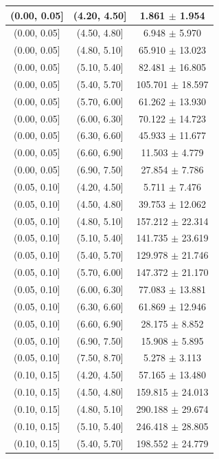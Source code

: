 \begin{longtable}{|c|c|c|}
\hline
\endlastfoot
(0.00, 0.05] & (4.20, 4.50] & 1.861 $\pm$ 1.954 \\ 
\hline
(0.00, 0.05] & (4.50, 4.80] & 6.948 $\pm$ 5.970 \\ 
\hline
(0.00, 0.05] & (4.80, 5.10] & 65.910 $\pm$ 13.023 \\ 
\hline
(0.00, 0.05] & (5.10, 5.40] & 82.481 $\pm$ 16.805 \\ 
\hline
(0.00, 0.05] & (5.40, 5.70] & 105.701 $\pm$ 18.597 \\ 
\hline
(0.00, 0.05] & (5.70, 6.00] & 61.262 $\pm$ 13.930 \\ 
\hline
(0.00, 0.05] & (6.00, 6.30] & 70.122 $\pm$ 14.723 \\ 
\hline
(0.00, 0.05] & (6.30, 6.60] & 45.933 $\pm$ 11.677 \\ 
\hline
(0.00, 0.05] & (6.60, 6.90] & 11.503 $\pm$ 4.779 \\ 
\hline
(0.00, 0.05] & (6.90, 7.50] & 27.854 $\pm$ 7.786 \\ 
\hline
(0.05, 0.10] & (4.20, 4.50] & 5.711 $\pm$ 7.476 \\ 
\hline
(0.05, 0.10] & (4.50, 4.80] & 39.753 $\pm$ 12.062 \\ 
\hline
(0.05, 0.10] & (4.80, 5.10] & 157.212 $\pm$ 22.314 \\ 
\hline
(0.05, 0.10] & (5.10, 5.40] & 141.735 $\pm$ 23.619 \\ 
\hline
(0.05, 0.10] & (5.40, 5.70] & 129.978 $\pm$ 21.746 \\ 
\hline
(0.05, 0.10] & (5.70, 6.00] & 147.372 $\pm$ 21.170 \\ 
\hline
(0.05, 0.10] & (6.00, 6.30] & 77.083 $\pm$ 13.881 \\ 
\hline
(0.05, 0.10] & (6.30, 6.60] & 61.869 $\pm$ 12.946 \\ 
\hline
(0.05, 0.10] & (6.60, 6.90] & 28.175 $\pm$ 8.852 \\ 
\hline
(0.05, 0.10] & (6.90, 7.50] & 15.908 $\pm$ 5.895 \\ 
\hline
(0.05, 0.10] & (7.50, 8.70] & 5.278 $\pm$ 3.113 \\ 
\hline
(0.10, 0.15] & (4.20, 4.50] & 57.165 $\pm$ 13.480 \\ 
\hline
(0.10, 0.15] & (4.50, 4.80] & 159.815 $\pm$ 24.013 \\ 
\hline
(0.10, 0.15] & (4.80, 5.10] & 290.188 $\pm$ 29.674 \\ 
\hline
(0.10, 0.15] & (5.10, 5.40] & 246.418 $\pm$ 28.805 \\ 
\hline
(0.10, 0.15] & (5.40, 5.70] & 198.552 $\pm$ 24.779 \\ 

\end{longtable}
